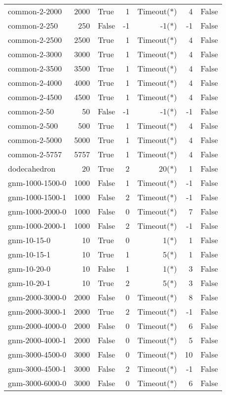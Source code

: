 \begin{longtable}{lrlrrrl}
common-2-2000 & 2000 & True & 1 & Timeout(*) & 4 & False \\
common-2-250 & 250 & False & -1 & -1(*) & -1 & False \\
common-2-2500 & 2500 & True & 1 & Timeout(*) & 4 & False \\
common-2-3000 & 3000 & True & 1 & Timeout(*) & 4 & False \\
common-2-3500 & 3500 & True & 1 & Timeout(*) & 4 & False \\
common-2-4000 & 4000 & True & 1 & Timeout(*) & 4 & False \\
common-2-4500 & 4500 & True & 1 & Timeout(*) & 4 & False \\
common-2-50 & 50 & False & -1 & -1(*) & -1 & False \\
common-2-500 & 500 & True & 1 & Timeout(*) & 4 & False \\
common-2-5000 & 5000 & True & 1 & Timeout(*) & 4 & False \\
common-2-5757 & 5757 & True & 1 & Timeout(*) & 4 & False \\
dodecahedron & 20 & True & 2 & 20(*) & 1 & False \\
gnm-1000-1500-0 & 1000 & False & 1 & Timeout(*) & -1 & False \\
gnm-1000-1500-1 & 1000 & False & 2 & Timeout(*) & -1 & False \\
gnm-1000-2000-0 & 1000 & False & 0 & Timeout(*) & 7 & False \\
gnm-1000-2000-1 & 1000 & False & 2 & Timeout(*) & -1 & False \\
gnm-10-15-0 & 10 & True & 0 & 1(*) & 1 & False \\
gnm-10-15-1 & 10 & True & 1 & 5(*) & 1 & False \\
gnm-10-20-0 & 10 & False & 1 & 1(*) & 3 & False \\
gnm-10-20-1 & 10 & True & 2 & 5(*) & 3 & False \\
gnm-2000-3000-0 & 2000 & False & 0 & Timeout(*) & 8 & False \\
gnm-2000-3000-1 & 2000 & True & 2 & Timeout(*) & -1 & False \\
gnm-2000-4000-0 & 2000 & False & 0 & Timeout(*) & 6 & False \\
gnm-2000-4000-1 & 2000 & False & 0 & Timeout(*) & 5 & False \\
gnm-3000-4500-0 & 3000 & False & 0 & Timeout(*) & 10 & False \\
gnm-3000-4500-1 & 3000 & False & 2 & Timeout(*) & -1 & False \\
gnm-3000-6000-0 & 3000 & False & 0 & Timeout(*) & 6 & False \\

\end{longtable}
